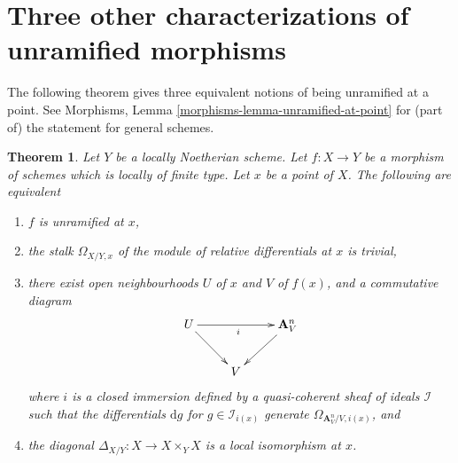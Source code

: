 \documentclass{stacks-project}
\theoremstyle{plain}
\newtheorem{theorem}[subsection]{Theorem}
\theoremstyle{definition}
\theoremstyle{remark}
\numberwithin{equation}{subsection}
\begin{document}
\section{Three other characterizations of unramified morphisms}
\label{section-three-other}

\noindent
The following theorem gives three equivalent notions of being
unramified at a point. See
Morphisms, Lemma \ref{morphisms-lemma-unramified-at-point}
for (part of) the statement for general schemes.

\begin{theorem}
\label{theorem-unramified-equivalence}
Let $Y$ be a locally Noetherian scheme.
Let $f : X \to Y$ be a morphism of schemes which is locally of finite type.
Let $x$ be a point of $X$. The following are equivalent
\begin{enumerate}
\item $f$ is unramified at $x$,
\item the stalk $\Omega_{X/Y, x}$ of the module of relative differentials
at $x$ is trivial,
\item there exist open neighbourhoods $U$ of $x$ and $V$ of $f(x)$, and a
commutative diagram
$$
\xymatrix{
U \ar[rr]_i \ar[rd] & & \mathbf{A}^n_V \ar[ld] \\
& V
}
$$
where $i$ is a closed immersion defined by a
quasi-coherent sheaf of ideals $\mathcal{I}$ such that the differentials
$\text{d}g$ for $g \in \mathcal{I}_{i(x)}$ generate
$\Omega_{\mathbf{A}^n_V/V, i(x)}$, and
\item the diagonal $\Delta_{X/Y} : X \to X \times_Y X$
is a local isomorphism at $x$.
\end{enumerate}
\end{theorem}
\end{document}
